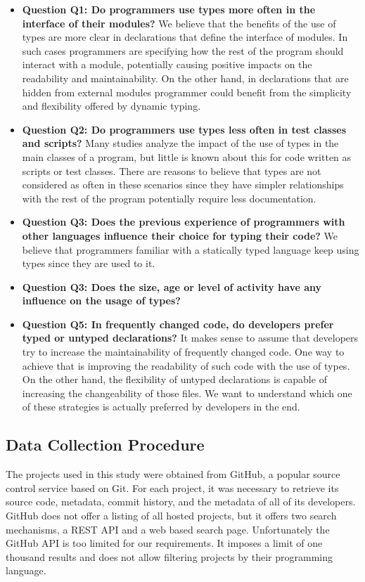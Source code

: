 \documentclass[preprint]{sigplanconf}
\begin{document}
\begin{itemize}
	\item \textbf{Question Q1: Do programmers use types more often in the interface of their modules?} We believe that the benefits of the use of types are more clear in declarations that define the interface of modules. In such cases programmers are specifying how the rest of the program should interact with a module, potentially causing positive impacts on the readability and maintainability. On the other hand, in declarations that are hidden from external modules programmer could benefit from the simplicity and flexibility offered by dynamic typing. 
	
	\item \textbf{Question Q2: Do programmers use types less often in test classes and scripts?} Many studies analyze the impact of the use of types in the main classes of a program, but little is known about this for code written as scripts or test classes. There are reasons to believe that types are not considered as often in these scenarios since they have simpler relationships with the rest of the program potentially require less documentation.

	\item \textbf{Question Q3: Does the previous experience of programmers with other languages influence their choice for typing their code?} We believe that programmers familiar with a statically typed language keep using types since they are used to it. 

	\item \textbf{Question Q3: Does the size, age or level of activity have any influence on the usage of types?} 

	\item \textbf{Question Q5: In frequently changed code, do developers prefer typed or untyped declarations?} It makes sense to assume that developers try to increase the maintainability of frequently changed code. One way to achieve that is improving the readability of such code with the use of types. On the other hand, the flexibility of untyped declarations is capable of increasing the changeability of those files. We want to understand which one of these strategies is actually preferred by developers in the end.

\end{itemize}

\subsection{Data Collection Procedure\label{dataCollection}}
The projects used in this study were obtained from GitHub, a popular source control service based on Git.
For each project, it was necessary to retrieve its source code, metadata, commit history, and the metadata of all of its developers.
GitHub does not offer a listing of all hosted projects, but it offers two search mechanisms, a REST API and a web based search page.
Unfortunately the GitHub API is too limited for our requirements.
It imposes a limit of one thousand results and does not allow filtering projects by their programming language.
\end{document}
